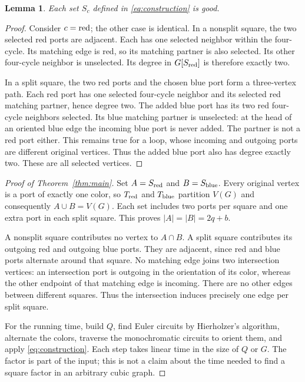 \documentclass[11pt]{article}
\newtheorem{lemma}[theorem]{Lemma}
\begin{document}
\begin{lemma}\label{lem:good}
Each set $S_c$ defined in \eqref{eq:construction} is good.
\end{lemma}
\begin{proof}
Consider $c={\rm red}$; the other case is identical.
In a nonsplit square, the two selected red ports are adjacent.
Each has one selected neighbor within the four-cycle. Its matching
edge is red, so its matching partner is also selected. Its other
four-cycle neighbor is unselected. Its degree in $G[S_{\rm red}]$
is therefore exactly two.

In a split square, the two red ports and the chosen blue port form a
three-vertex path. Each red port has one selected four-cycle neighbor
and its selected red matching partner, hence degree two.
The added blue port has its two red four-cycle neighbors selected.
Its blue matching partner is unselected: at the head of an oriented
blue edge the incoming blue port is never added. The partner is not
a red port either. This remains true for a loop, whose incoming and
outgoing ports are different original vertices.
Thus the added blue port also has degree exactly two.
These are all selected vertices.
\end{proof}

\begin{proof}[Proof of Theorem~\ref{thm:main}]
Set $A=S_{\rm red}$ and $B=S_{\rm blue}$.
Every original vertex is a port of exactly one color, so $T_{\rm red}$
and $T_{\rm blue}$ partition $V(G)$ and consequently $A\cup B=V(G)$.
Each set includes two ports per square and one extra port in each
split square. This proves $|A|=|B|=2q+b$.

A nonsplit square contributes no vertex to $A\cap B$.
A split square contributes its outgoing red and outgoing blue ports.
They are adjacent, since red and blue ports alternate around that
square. No matching edge joins two intersection vertices: an
intersection port is outgoing in the orientation of its color, whereas
the other endpoint of that matching edge is incoming.
There are no other edges between different squares.
Thus the intersection induces precisely one edge per split square.

For the running time, build $Q$, find Euler circuits by
Hierholzer's algorithm, alternate the colors, traverse the monochromatic
circuits to orient them, and apply \eqref{eq:construction}.
Each step takes linear time in the size of $Q$ or $G$.
The factor is part of the input; this is not a claim about the time
needed to find a square factor in an arbitrary cubic graph.
\end{proof}
\end{document}
